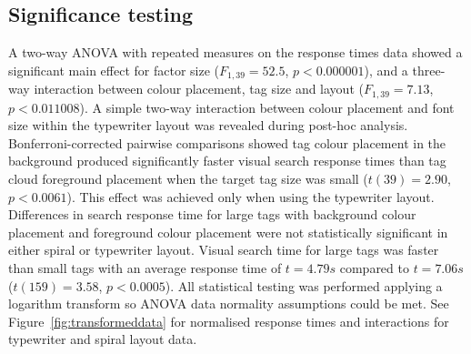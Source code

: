 \subsection{Significance testing}

A two-way ANOVA with repeated measures on the response times data showed a significant main effect for factor size ($F_{1,39}=52.5$, $p<0.000001$), and a three-way interaction between colour placement, tag size and layout ($F_{1,39}=7.13$, $p<0.011008$). A simple two-way interaction between colour placement and font size within the typewriter layout was revealed during post-hoc analysis. Bonferroni-corrected pairwise comparisons showed tag colour placement in the background produced significantly faster visual search response times than tag cloud foreground placement when the target tag size was small ($t(39)=2.90$, $p<0.0061$). This effect was achieved only when using the typewriter layout. Differences in search response time for large tags with background colour placement and foreground colour placement were not statistically significant in either spiral or typewriter layout. Visual search time for large tags was faster than small tags with an average response time of $t=4.79s$ compared to $t=7.06s$ ($t(159)=3.58$, $p< 0.0005$). All statistical testing was performed applying a logarithm transform so ANOVA data normality assumptions could be met. See Figure~\vref{fig:transformeddata} for normalised response times and interactions for typewriter and spiral layout data.

